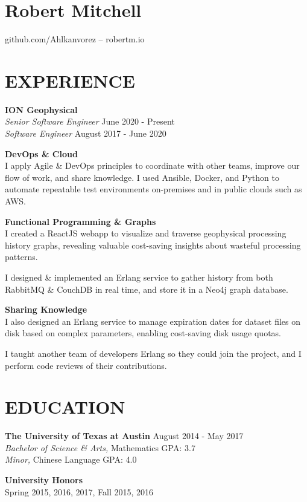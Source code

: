 \documentclass[line,margin]{res}
\begin{document}
\section{Robert Mitchell}
\hfill github.com/Ahlkanvorez -- robertm.io
\address{robert.mitchell36@gmail.com}

\begin{resume}

\section{EXPERIENCE}
    \textbf{ION Geophysical} \\
    \textit{Senior Software Engineer}
    \hfill June 2020 - Present \\
    \textit{Software Engineer}
    \hfill August 2017 - June 2020

    \textbf{DevOps \& Cloud} \\
    I apply Agile \& DevOps principles to coordinate with other teams,
    improve our flow of work, and share knowledge. I used Ansible,
    Docker, and Python to automate repeatable test environments
    on-premises and in public clouds such as AWS.

    \textbf{Functional Programming \& Graphs} \\
    I created a ReactJS webapp to visualize and traverse geophysical
    processing history graphs, revealing valuable cost-saving insights
    about wasteful processing patterns.

    I designed \& implemented an Erlang service to gather history from
    both RabbitMQ \& CouchDB in real time, and store it in a Neo4j
    graph database.

    \textbf{Sharing Knowledge} \\
    I also designed an Erlang service to manage expiration dates for
    dataset files on disk based on complex parameters, enabling
    cost-saving disk usage quotas.

    I taught another team of developers Erlang so they could join the
    project, and I perform code reviews of their contributions. \\


\section{EDUCATION}
    \textbf{The University of Texas at Austin} 	\hfill August 2014 - May 2017 \\
    \textit{Bachelor of Science \& Arts,} Mathematics \hfill GPA: 3.7 \\
    \textit{Minor,} Chinese Language \hfill GPA:    4.0
    \begin{description}
        \item \textbf{University Honors} \hfill \\
            Spring 2015, 2016, 2017, Fall 2015, 2016 \\
    \end{description}



\end{resume}
\end{document}
